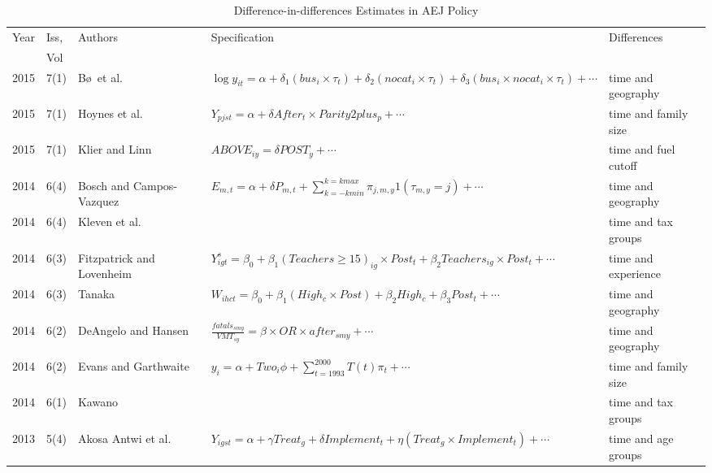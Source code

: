 \begin{landscape}
\begin{table}
\begin{center}
\caption{Difference-in-differences Estimates in AEJ Policy}
\label{Stab:AEJ}
\begin{tabular}{lllll}\toprule
Year & Iss, & Authors & Specification & Differences\\
& Vol & & \\ \midrule
2015 & 7(1) & B\o\ et al. & $\log y_{it}=\alpha + \delta_1(bus_i\times
\tau_t)+\delta_2(nocat_i\times\tau_t)+\delta_3(bus_i\times
nocat_i\times\tau_t)+\cdots$ 
& time and geography \\

2015 & 7(1) & Hoynes et al. & $Y_{pjst} = \alpha + \delta
After_t\times Parity2plus_p + \cdots$  & time and family size \\

2015 & 7(1) & Klier and Linn & $ABOVE_{iy}=\delta POST_y + \cdots$ & time and fuel cutoff\\

2014 & 6(4) & Bosch and Campos-Vazquez & $E_{m,t}=\alpha+\delta
P_{m,t}+\sum_{k=-k min}^{k=k max}\pi_{j,m,y}1(\tau_{m,y}=j)+\cdots$ &
time and geography \\

2014 & 6(4) &Kleven et al. &  & time and tax groups\\

2014 & 6(3) & Fitzpatrick and Lovenheim &
$Y^s_{igt}=\beta_0+\beta_1(Teachers\geq 15)_{ig}\times Post_t +
\beta_2 Teachers_{ig}\times Post_t+\cdots$ & time and experience \\

2014 & 6(3) & Tanaka & $W_{ihct}=\beta_0+\beta_1(High_c\times Post) +
\beta_2 High_c+\beta_3 Post_t + \cdots$ & time and geography \\

2014 & 6(2) & DeAngelo and Hansen &
$\frac{fatals_{smy}}{VMT_{sy}}=\beta\times OR \times
after_{smy}+\cdots$ & time and geography \\

2014 & 6(2) & Evans and Garthwaite &
$y_i=\alpha+Two_i\phi+\sum_{t=1993}^{2000}T(t)\pi_t+\cdots$  & time and family size\\

2014 & 6(1) & Kawano & & time and tax groups \\

2013 & 5(4) & Akosa Antwi et al. & $Y_{igst}=\alpha+\gamma Treat_g +
\delta Implement_t + \eta (Treat_g\times Implement_t)+\cdots$  & time and age groups \\


\end{tabular}
\end{center}
\end{table}
\end{landscape}
